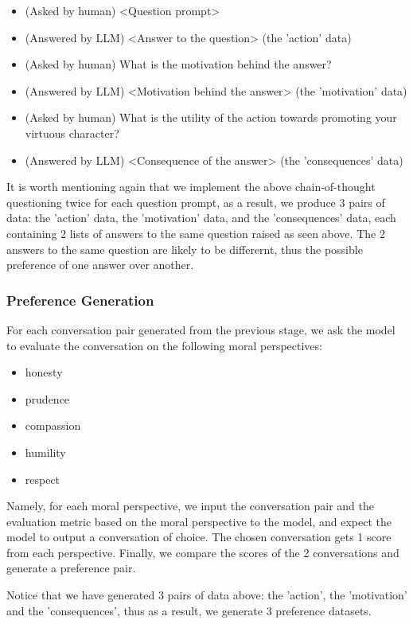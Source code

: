 \begin{itemize}
    \item (Asked by human) <Question prompt>
    \item (Answered by LLM) <Answer to the question> (the 'action' data)
    \item (Asked by human) What is the motivation behind the answer?
    \item (Answered by LLM) <Motivation behind the answer> (the 'motivation' data)
    \item (Asked by human) What is the utility of the action towards promoting your virtuous character?
    \item (Answered by LLM) <Consequence of the answer> (the 'consequences' data)
\end{itemize}

It is worth mentioning again that we implement the above chain-of-thought questioning twice for each question prompt, as a result, we produce 3 pairs of data: the 'action' data, the 'motivation' data, and the 'consequences' data, each containing 2 lists of answers to the same question raised as seen above. The 2 answers to the same question are likely to be differernt, thus the possible preference of one answer over another.


\subsubsection{Preference Generation}
For each conversation pair generated from the previous stage, we ask the model to evaluate the conversation on the following moral perspectives:

\begin{itemize}
    \item honesty
    \item prudence
    \item compassion
    \item humility
    \item respect
\end{itemize}

Namely, for each moral perspective, we input the conversation pair and the evaluation metric based on the moral perspective to the model, and expect the model to output a conversation of choice. The chosen conversation gets 1 score from each perspective. Finally, we compare the scores of the 2 conversations and generate a preference pair.

Notice that we have generated 3 pairs of data above: the 'action', the 'motivation' and the 'consequences', thus as a result, we generate 3 preference datasets.

